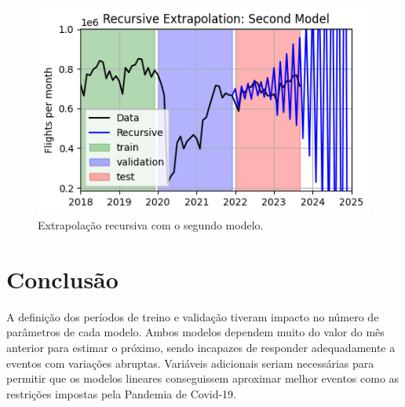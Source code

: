 \documentclass[final,5p]{elsarticle}
\numberwithin{equation}{section}
\begin{document}
        \begin{figure}[hbt!]
            \includegraphics[width=0.95\columnwidth]{C3_RecursiveExtrapolation_new.png}
            \caption{Extrapolação recursiva com o segundo modelo.}
            \label{fig:extrapolacao_segundo_modelo}
        \end{figure}


\section{Conclusão}

    A definição dos períodos de treino e validação tiveram impacto no número de parâmetros de cada modelo. Ambos modelos dependem muito do valor do mês anterior para estimar o próximo, sendo incapazes de responder adequadamente a eventos com variações abruptas. Variáveis adicionais seriam necessárias para permitir que os modelos lineares conseguissem aproximar melhor eventos como as restrições impostas pela Pandemia de Covid-19.


\appendix





\end{document}
